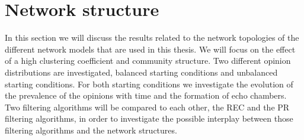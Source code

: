 \documentclass[11 pt , letterpaper , twoside , openright]{book}
\begin{document}
\section{Network structure}\label{netw_struc}

In this section we will discuss the results related to the network topologies of the different network models that are used in this thesis. We will focus on the effect of a high clustering coefficient and community structure. Two different opinion distributions are investigated, balanced starting conditions and unbalanced starting conditions. For both starting conditions we investigate the evolution of the prevalence of the opinions with time and the formation of echo chambers. Two filtering algorithms will be compared to each other, the REC and the PR filtering algorithms, in order to investigate the possible interplay between those filtering algorithms and the network structures.\\
\end{document}

